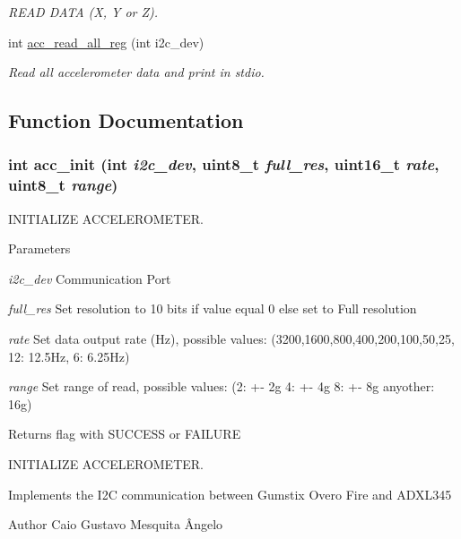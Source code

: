 \begin{DoxyCompactItemize}
\begin{DoxyCompactList}\small\item\em READ DATA (X, Y or Z). \item\end{DoxyCompactList}\item 
int \hyperlink{group__acc_ga8509cccabb08e7267677f66f25718731}{acc\_\-read\_\-all\_\-reg} (int i2c\_\-dev)
\begin{DoxyCompactList}\small\item\em Read all accelerometer data and print in stdio. \item\end{DoxyCompactList}\end{DoxyCompactItemize}


\subsection{Function Documentation}
\hypertarget{group__acc_gae8f9cc6e0d15e61039d846305f86f073}{
\subsubsection[{acc\_\-init}]{\setlength{\rightskip}{0pt plus 5cm}int acc\_\-init (int {\em i2c\_\-dev}, \/  uint8\_\-t {\em full\_\-res}, \/  uint16\_\-t {\em rate}, \/  uint8\_\-t {\em range})}}
\label{group__acc_gae8f9cc6e0d15e61039d846305f86f073}


INITIALIZE ACCELEROMETER. 


\begin{DoxyParams}{Parameters}
\item[{\em i2c\_\-dev}]Communication Port \item[{\em full\_\-res}]Set resolution to 10 bits if value equal 0 else set to Full resolution \item[{\em rate}]Set data output rate (Hz), possible values: (3200,1600,800,400,200,100,50,25, 12: 12.5Hz, 6: 6.25Hz) \item[{\em range}]Set range of read, possible values: (2: +-\/ 2g 4: +-\/ 4g 8: +-\/ 8g anyother: 16g) \end{DoxyParams}
\begin{DoxyReturn}{Returns}
flag with SUCCESS or FAILURE
\end{DoxyReturn}
INITIALIZE ACCELEROMETER.

Implements the I2C communication between Gumstix Overo Fire and ADXL345 \begin{DoxyAuthor}{Author}
Caio Gustavo Mesquita Ângelo 
\end{DoxyAuthor}


